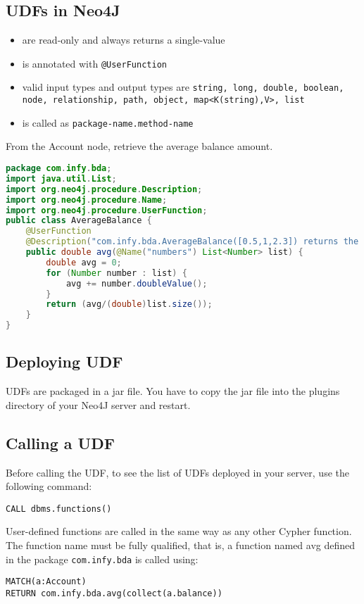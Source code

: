 \documentclass[../main.tex]{subfiles}
\begin{document}
\subsection{UDFs in Neo4J}
\begin{itemize}
	\item{are read-only and always returns a single-value}
	\item{is annotated with \lstinline{@UserFunction}}
	\item{valid input types and output types are \lstinline{string, long, double, boolean, node, relationship, path, object, map<K(string),V>, list}}
	\item{is called as \lstinline{package-name.method-name}}
\end{itemize}
From the Account node, retrieve the average balance amount.
\begin{lstlisting}[language=java]
package com.infy.bda;
import java.util.List;
import org.neo4j.procedure.Description;
import org.neo4j.procedure.Name;
import org.neo4j.procedure.UserFunction;
public class AverageBalance {
    @UserFunction
    @Description("com.infy.bda.AverageBalance([0.5,1,2.3]) returns the average of the given list of values")
    public double avg(@Name("numbers") List<Number> list) {
        double avg = 0;
        for (Number number : list) {
            avg += number.doubleValue();
        }
        return (avg/(double)list.size());
    }
}
\end{lstlisting}

\subsection{Deploying UDF}
UDFs are packaged in a jar file. You have to copy the jar file into the plugins directory of your Neo4J server and restart.
\subsection{Calling a UDF}
Before calling the UDF, to see the list of UDFs deployed in your server, use the following command:
\begin{lstlisting}[language=cypher]
CALL dbms.functions()
\end{lstlisting}
User-defined functions are called in the same way as any other Cypher function. The function name must be fully qualified, that is, a function named avg defined in the package \lstinline{com.infy.bda} is called using: 
\begin{lstlisting}[language=cypher]
MATCH(a:Account)
RETURN com.infy.bda.avg(collect(a.balance))
\end{lstlisting}
\end{document}
